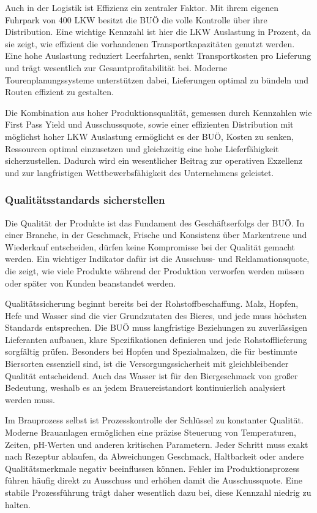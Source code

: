 Auch in der Logistik ist Effizienz ein zentraler Faktor. Mit ihrem eigenen Fuhrpark von 400 LKW besitzt die BUÖ die volle Kontrolle über ihre Distribution. Eine wichtige Kennzahl ist hier die LKW Auslastung in Prozent, da sie zeigt, wie effizient die vorhandenen Transportkapazitäten genutzt werden. Eine hohe Auslastung reduziert Leerfahrten, senkt Transportkosten pro Lieferung und trägt wesentlich zur Gesamtprofitabilität bei. Moderne Tourenplanungssysteme unterstützen dabei, Lieferungen optimal zu bündeln und Routen effizient zu gestalten.  

Die Kombination aus hoher Produktionsqualität, gemessen durch Kennzahlen wie First Pass Yield und Ausschussquote, sowie einer effizienten Distribution mit möglichst hoher LKW Auslastung ermöglicht es der BUÖ, Kosten zu senken, Ressourcen optimal einzusetzen und gleichzeitig eine hohe Lieferfähigkeit sicherzustellen. Dadurch wird ein wesentlicher Beitrag zur operativen Exzellenz und zur langfristigen Wettbewerbsfähigkeit des Unternehmens geleistet.  


\subsubsection{Qualitätsstandards sicherstellen}  


Die Qualität der Produkte ist das Fundament des Geschäftserfolgs der BUÖ. In einer Branche, in der Geschmack, Frische und Konsistenz über Markentreue und Wiederkauf entscheiden, dürfen keine Kompromisse bei der Qualität gemacht werden. Ein wichtiger Indikator dafür ist die Ausschuss- und Reklamationsquote, die zeigt, wie viele Produkte während der Produktion verworfen werden müssen oder später von Kunden beanstandet werden.  

Qualitätssicherung beginnt bereits bei der Rohstoffbeschaffung. Malz, Hopfen, Hefe und Wasser sind die vier Grundzutaten des Bieres, und jede muss höchsten Standards entsprechen. Die BUÖ muss langfristige Beziehungen zu zuverlässigen Lieferanten aufbauen, klare Spezifikationen definieren und jede Rohstofflieferung sorgfältig prüfen. Besonders bei Hopfen und Spezialmalzen, die für bestimmte Biersorten essenziell sind, ist die Versorgungssicherheit mit gleichbleibender Qualität entscheidend. Auch das Wasser ist für den Biergeschmack von großer Bedeutung, weshalb es an jedem Brauereistandort kontinuierlich analysiert werden muss.  

Im Brauprozess selbst ist Prozesskontrolle der Schlüssel zu konstanter Qualität. Moderne Brauanlagen ermöglichen eine präzise Steuerung von Temperaturen, Zeiten, pH-Werten und anderen kritischen Parametern. Jeder Schritt muss exakt nach Rezeptur ablaufen, da Abweichungen Geschmack, Haltbarkeit oder andere Qualitätsmerkmale negativ beeinflussen können. Fehler im Produktionsprozess führen häufig direkt zu Ausschuss und erhöhen damit die Ausschussquote. Eine stabile Prozessführung trägt daher wesentlich dazu bei, diese Kennzahl niedrig zu halten.  

